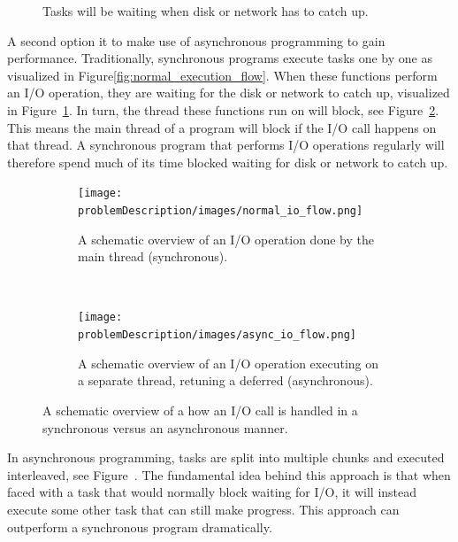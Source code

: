 \begin{figure}[h]
	\caption{Tasks will be waiting when disk or network has to catch up.}
	\label{fig:delays_in_execution}
\end{figure}

A second option it to make use of asynchronous programming to gain performance.
Traditionally, synchronous programs execute tasks one by one as visualized in Figure\ref{fig:normal_execution_flow}.
When these functions perform an I/O operation, they are waiting for the disk or network to catch up, visualized in Figure~\ref{fig:delays_in_execution}.
In turn, the thread these functions run on will block, see Figure~\ref{fig:normal_io_flow}.
This means the main thread of a program will block if the I/O call happens on that thread.
A synchronous program that performs I/O operations regularly will therefore spend much of its time blocked waiting for disk or network to catch up.

\begin{figure}[t]
	\centering
	\begin{subfigure}[b]{\textwidth}
		\texttt{[image: problemDescription/images/normal\_io\_flow.png]}
		\caption{A schematic overview of an I/O operation done by the main thread (synchronous).}
		\label{fig:normal_io_flow}
	\end{subfigure}
	~ %
	\begin{subfigure}[b]{\textwidth}
		\texttt{[image: problemDescription/images/async\_io\_flow.png]}
		\caption{A schematic overview of an I/O operation executing on a separate thread, retuning a deferred (asynchronous).}
		\label{fig:async_io_flow}
	\end{subfigure}
	\caption{A schematic overview of a how an I/O call is handled in a synchronous versus an asynchronous manner.}
\end{figure}

In asynchronous programming, tasks are split into multiple chunks and executed interleaved, see Figure~.
The fundamental idea behind this approach is that when faced with a task that would normally block waiting for I/O, it will instead execute some other task that can still make progress.
This approach can outperform a synchronous program dramatically.

